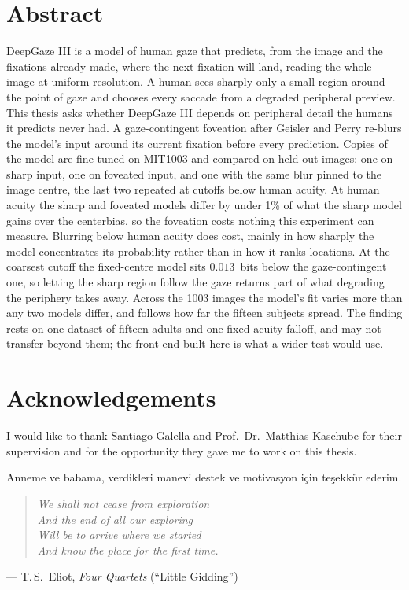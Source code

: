 \documentclass[
  paper=a4,
  fontsize=11pt,
  twoside=false,
  BCOR=10mm,
  DIV=11,
  parskip=half,
  numbers=noenddot,
  bibliography=totoc,
  listof=totoc,
  open=any,
  chapterprefix=true,
]{scrreprt}
\begin{document}
\chapter*{Abstract}
DeepGaze III is a model of human gaze that predicts, from the image and the fixations already made,
where the next fixation will land, reading the whole image at uniform resolution. A human sees
sharply only a small region around the point of gaze and chooses every saccade from a degraded
peripheral preview. This thesis asks whether DeepGaze III depends on peripheral detail the humans it
predicts never had. A gaze-contingent foveation after Geisler and Perry re-blurs the model's input
around its current fixation before every prediction. Copies of the model are fine-tuned on MIT1003 and
compared on held-out images: one on sharp input, one on foveated input, and one with the same blur
pinned to the image centre, the last two repeated at cutoffs below human acuity. At human acuity the
sharp and foveated models differ by under 1\% of what the sharp model gains over the centerbias, so
the foveation costs nothing this experiment can measure. Blurring below
human acuity does cost, mainly in how sharply the model concentrates its probability rather than in
how it ranks locations. At the coarsest cutoff the fixed-centre model sits $0.013$~bits below the
gaze-contingent one, so letting the sharp region follow the gaze returns part of what degrading the
periphery takes away. Across the 1003 images the model's fit varies more than any two models differ,
and follows how far the fifteen subjects spread. The finding rests on one dataset of fifteen adults
and one fixed acuity falloff, and may not transfer beyond them; the front-end built here is what a
wider test would use.
\cleardoublepage
\chapter*{Acknowledgements}
I would like to thank Santiago Galella and Prof.\ Dr.\ Matthias Kaschube for their supervision and for the opportunity they gave me to work on this thesis.

Anneme ve babama, verdikleri manevi destek ve motivasyon için teşekkür ederim.

\bigskip
\begin{quote}
\itshape
We shall not cease from exploration\\
And the end of all our exploring\\
Will be to arrive where we started\\
And know the place for the first time.
\end{quote}
\begin{flushright}
--- T.\,S.\ Eliot, \emph{Four Quartets} (\enquote{Little Gidding})
\end{flushright}
\end{document}
